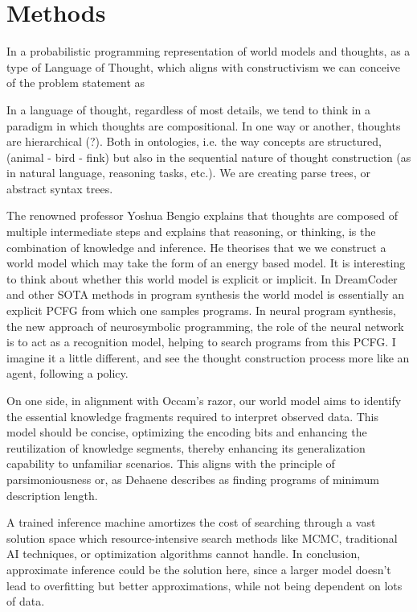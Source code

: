 \section{Methods}







In a probabilistic programming representation of world models and thoughts, as a type of Language of Thought, which aligns with constructivism we can conceive of the problem statement as 


In a language of thought, regardless of most details, we tend to think in a paradigm in which thoughts are compositional. In one way or another, thoughts are hierarchical (?).
Both in ontologies, i.e. the way concepts are structured, (animal - bird - fink) but also in the sequential nature of thought construction (as in natural language, reasoning tasks, etc.). We are creating parse trees, or abstract syntax trees. 

The renowned professor Yoshua Bengio explains that thoughts are composed of multiple intermediate steps and explains that reasoning, or thinking, is the combination of knowledge and inference. 
He theorises that we we construct a world model which may take the form of an energy based model.
It is interesting to think about whether this world model is explicit or implicit. In DreamCoder and other SOTA methods in program synthesis the world model is essentially an explicit PCFG from which one samples programs. In neural program synthesis, the new approach of neurosymbolic programming, the role of the neural network is to act as a recognition model, helping to search programs from this PCFG.
I imagine it a little different, and see the thought construction process more like an agent, following a policy.

On one side, in alignment with Occam's razor, our world model aims to identify the essential knowledge fragments required to interpret observed data. This model should be concise, optimizing the encoding bits and enhancing the reutilization of knowledge segments, thereby enhancing its generalization capability to unfamiliar scenarios. This aligns with the principle of parsimoniousness or, as Dehaene describes as finding programs of minimum description length.

A trained inference machine amortizes the cost of searching through a vast solution space which resource-intensive search methods like MCMC, traditional AI techniques, or optimization algorithms cannot handle.
In conclusion, approximate inference could be the solution here, since a larger model doesn't lead to overfitting but better approximations, while not being dependent on lots of data.

